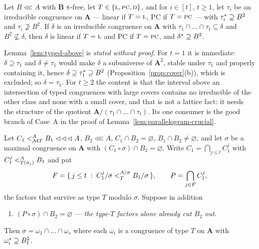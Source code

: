 \begin{lemma}\label{lem:typed-above}
Let $B\lll A$ with $\mathbf B$ $\TS$-free, let $T\in\{\TL,\TPC,\TD\}$, and
for $i\in[t]$, $t\ge1$, let $\tau_{i}$ be an irreducible congruence on
$\mathbf A$ --- linear if $T=\TL$, PC if $T=\TPC$ --- with
$\cover{\tau_{i}}\supseteq B^{2}$ and $\tau_{i}\not\supseteq B^{2}$. If
$\delta$ is an irreducible congruence on $\mathbf A$ with
$\tau_{1}\cap\dots\cap\tau_{t}\subseteq\delta$ and
$B^{2}\not\subseteq\delta$, then $\delta$ is linear if $T=\TL$ and PC if
$T=\TPC$, and $\cover{\delta}\supseteq B^{2}$.
\end{lemma}

\begin{hazard}[Stated only; the $t=1$ case is free]\label{haz:typed-above}
Lemma~\ref{lem:typed-above} is \emph{stated without proof}. For $t=1$ it is
immediate: $\delta\supseteq\tau_{1}$ and $\delta\neq\tau_{1}$ would make
$\delta$ a subuniverse of $\mathbf A^{2}$, stable under $\tau_{1}$ and
properly containing it, hence $\delta\supseteq\cover{\tau_{1}}\supseteq
B^{2}$ (Proposition~\ref{prop:cover}(b)), which is excluded; so
$\delta=\tau_{1}$. For $t\ge2$ the content is that the interval above an
intersection of typed congruences with large covers contains no irreducible
of the other class and none with a small cover, and that is not a lattice
fact: it needs the structure of the quotient
$\mathbf A/(\tau_{1}\cap\dots\cap\tau_{t})$. Its one consumer is the good
branch of Case~A in the proof of Lemma~\ref{lem:parallelogram-crucial}.
\end{hazard}

\begin{longlemma}\label{lem:maximal-mult}
Let $C_{1}\subt[A]{\MT T}B_{1}\lll A$, $B_{2}\lll A$,
$C_{1}\cap B_{2}=\varnothing$, $B_{1}\cap B_{2}\neq\varnothing$, and let
$\sigma$ be a maximal congruence on $\mathbf A$ with
$(C_{1}\circ\sigma)\cap B_{2}=\varnothing$. Write
$C_{1}=\bigcap_{j\le t}C_{1}^{j}$ with $C_{1}^{j}\subt[A]{T(\sigma_{j})}B_{1}$
and put
\[
  F=\{\,j\le t\;:\;C_{1}^{j}/\sigma\subt[A/\sigma]{T}B_{1}/\sigma\,\},
  \qquad P=\bigcap_{j\in F}C_{1}^{j},
\]
the factors that survive as type $T$ modulo $\sigma$. Suppose in addition
\begin{enumerate}\romanlabels\tightlist
\item\label{hyp:maximal-mult} $(P\circ\sigma)\cap B_{2}=\varnothing$ ---
  \emph{the type-$T$ factors alone already cut $B_{2}$ out}.
\end{enumerate}
Then $\sigma=\omega_{1}\cap\dots\cap\omega_{s}$ where each $\omega_{i}$ is a
congruence of type $T$ on $\mathbf A$ with $\cover{\omega_{i}}\supseteq
B_{1}^{2}$.
\end{longlemma}

